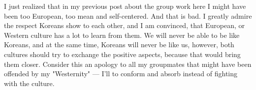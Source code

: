 \begin{post}
	\begin{content}
I just realized that in my previous post about the group work here I might have been too European, too mean and self-centered. And that is bad. I greatly admire the respect Koreans show to each other, and I am convinced, that European, or Western culture has a lot to learn from them. We will never be able to be like Koreans, and at the same time, Koreans will never be like us, however, both cultures should try to exchange the positive aspects, because that would bring them closer. Consider this an apology to all my groupmates that might have been offended by my "Westernity" — I'll to conform and absorb instead of fighting with the culture.
	\end{content}
\end{post}
